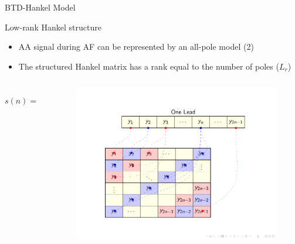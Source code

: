 \documentclass{beamer}
\begin{document}
	\begin{frame}{BTD-Hankel Model}
		
		\vspace{-0.5cm}
		\begin{block}{Low-rank Hankel structure}
			\begin{itemize}
				\item AA signal during AF can be represented by an all-pole model (2)
			\end{itemize}
			\begin{itemize}
				\item The structured Hankel matrix has a rank equal to the number of poles ($L_{r}$)
			\end{itemize}
		\end{block}
		\begin{columns}
			\begin{column}{0.5\textwidth}		
				\vspace{2.5cm}
				\begin{equation}
					s(n) = \sum_{\ell = 1}^{L_{r}} \alpha_{\ell} z_{\ell}^{n}
				\end{equation}
			\end{column}
			\begin{column}{0.5\textwidth}
				\begin{figure}[htb]
					\vspace{-5.0cm}
					\centering
					\includegraphics[scale=0.66,clip=true,trim={1.5cm 8.5cm 1.8cm 8.3cm}]{fig/tikz_mapHankel.pdf}
				\end{figure}
			\end{column}
		\end{columns}
	\end{frame}
\end{document}

